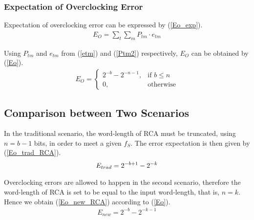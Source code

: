 \documentclass[prodmode,acmtrets]{acmsmall} %
\begin{document}
\subsubsection{Expectation of Overclocking Error}
Expectation of overclocking error can be expressed by (\ref{Eo_exp}).
%
\begin{eqnarray}\label{Eo_exp}
    E_O=\sum_{t}\sum_{m}P_{tm}\cdot e_{tm}
\end{eqnarray}

Using $P_{tm}$ and $e_{tm}$ from (\ref{etm}) and (\ref{Ptm2}) respectively, $E_O$ can be obtained by (\ref{Eo}).
%
\begin{eqnarray}\label{Eo}
      E_O=\left\{
        \begin{matrix}
            2^{-b}-2^{-n-1}, & \textrm{if $b\leq n$}\\
            0, & \textrm{otherwise}
        \end{matrix}
      \right.
\end{eqnarray}

\subsection{Comparison between Two Scenarios}\label{section_RCA_Comparison}
In the traditional scenario, the word-length of RCA must be truncated, using $n=b-1$ bits, in order to meet a given $f_S$. The error expectation is then given by (\ref{Eo_trad_RCA}).
%
\begin{eqnarray}\label{Eo_trad_RCA}
  E_{trad}=2^{-b+1}-2^{-k}
  \vspace{-1ex}
\end{eqnarray}

Overclocking errors are allowed to happen in the second scenario, therefore the word-length of RCA is set to be equal to the input word-length, that is, $n=k$. Hence we obtain (\ref{Eo_new_RCA}) according to (\ref{Eo}).
%
\begin{eqnarray}\label{Eo_new_RCA}
  E_{new}=2^{-b}-2^{-k-1}
\end{eqnarray}
\end{document}
